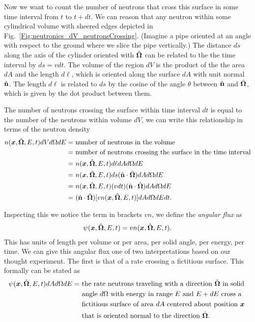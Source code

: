 Now we want to count the number of neutrons that cross this surface in some time interval from $t$ to $t + dt$. We can reason that any neutron within some cylindrical volume with sheered edges depicted in Fig.~\ref{Fig:neutronics_dV_neutronsCrossing}. (Imagine a pipe oriented at an angle with respect to the ground where we slice the pipe vertically.) The distance $ds$ along the axis of the cylinder oriented with $\hat{\mathbf{\Omega}}$ can be related to the the time interval by $ds = vdt$. The volume of the region $dV$ is the product of the the area $dA$ and the length $d\ell$, which is oriented along the surface $dA$ with unit normal $\hat{\mathbf{n}}$. The length $d\ell$ is related to $ds$ by the cosine of the angle $\theta$ between $\hat{\mathbf{n}}$ and $\hat{\mathbf{\Omega}}$, which is given by the dot product between them.

The number of neutrons crossing the surface within time interval $dt$ is equal to the number of the neutrons within volume $dV$, we can write this relationship in terms of the neutron density
\begin{align}
  n(\bm{x},\hat{\mathbf{\Omega}},E,t) dV d\Omega dE = 
  	&\text{ number of neutrons in the volume} \nonumber \\*
  = &\text{ number of neutrons crossing the surface in the time interval} \nonumber \\*
  =	&\ n(\bm{x},\hat{\mathbf{\Omega}},E,t) d\ell dA d\Omega dE \nonumber \\
  =	&\ n(\bm{x},\hat{\mathbf{\Omega}},E,t) ds (\hat{\mathbf{n}} \cdot \hat{\mathbf{\Omega}}) dA d\Omega dE \nonumber \\
  = &\ n(\bm{x},\hat{\mathbf{\Omega}},E,t) (v dt) (\hat{\mathbf{n}} \cdot \hat{\mathbf{\Omega}}) dA d\Omega dE \nonumber \\
  = &\ (\hat{\mathbf{n}} \cdot \hat{\mathbf{\Omega}})  [ v n(\bm{x},\hat{\mathbf{\Omega}},E,t) ] dA d\Omega dE dt. \nonumber 
\end{align}

Inspecting this we notice the term in brackets $vn$, we define the \emph{angular flux} as
\begin{align}
  \psi(\bm{x},\hat{\mathbf{\Omega}},E,t) = v n(\bm{x},\hat{\mathbf{\Omega}},E,t) .
\end{align}
This has units of length per volume or per area, per solid angle, per energy, per time. We can give this angular flux one of two interpretations based on our thought experiment. The first is that of a rate crossing a fictitious surface. This formally can be stated as
\begin{align}
  \psi(\bm{x},\hat{\mathbf{\Omega}},E,t) dA d\Omega dE 
  = &\text{ the rate neutrons traveling with a direction $\hat{\mathbf{\Omega}}$ in solid } \nonumber \\*
   	&\text{ angle $d\Omega$ with energy in range $E$ and $E + dE$ cross a} \nonumber \\*
	&\text{ fictitious surface of area $dA$ centered about position $\bm{x}$ } \nonumber \\*
   	&\text{ that is oriented normal to  the direction $\hat{\mathbf{\Omega}}$.} \nonumber 
\end{align}

